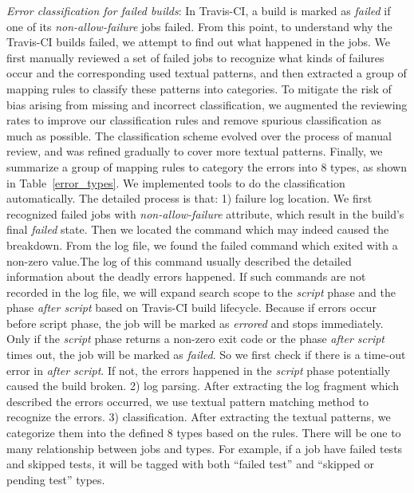 
\emph{Error classification for failed builds}: 
In Travis-CI, a build is marked as \textit{failed} if one of its \textit{non-allow-failure} jobs failed. From this point, to understand why the Travis-CI builds failed, we attempt to find out what happened in the jobs. We first manually reviewed a set of failed jobs to recognize what kinds of failures occur and the corresponding used textual patterns, and then extracted a group of mapping rules to classify these patterns into categories. To mitigate the risk of bias arising from missing and incorrect classification, we augmented the reviewing rates to improve our classification rules and remove spurious classification as much as possible. The classification scheme evolved over the process of manual review, and was refined gradually to cover more textual patterns. Finally, we summarize a group of mapping rules to category the errors into 8 types, as shown in Table~\ref{error_types}. 
We implemented tools to do the classification automatically. The detailed process is that: 1) failure log location. We first recognized failed jobs with \textit{non-allow-failure} attribute, which result in the build's final \textit{failed} state. Then we located the command which may indeed caused the breakdown. From the log file, we found the failed command which exited with a non-zero value.The log of this command usually described the detailed information about the deadly errors happened. If such commands are not recorded in the log file, we will expand search scope to the \textit{script} phase and the phase \textit{after script} based on Travis-CI build lifecycle. Because if errors occur before script phase, the job will be marked as \textit{errored} and stops immediately. Only if the \textit{script} phase returns a non-zero exit code or the phase \textit{after script} times out, the job will be marked as \textit{failed}. So we first check if there is a time-out error in \textit{after script}. If not, the errors happened in the \textit{script} phase potentially caused the build broken. 
2) log parsing. After extracting the log fragment which described the errors occurred, we use textual pattern matching method to recognize the errors. 
3) classification. After extracting the textual patterns, we categorize them  into the defined 8 types based on the rules. There will be one to many relationship between jobs and types. For example, if a job have failed tests and skipped tests, it will be tagged with both ``failed test'' and ``skipped or pending test'' types.


